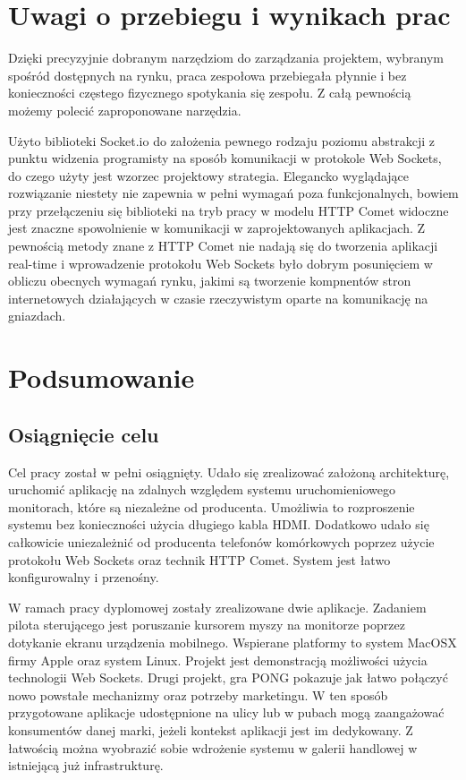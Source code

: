 \newpage
\section{Uwagi o przebiegu i wynikach prac}

Dzięki precyzyjnie dobranym narzędziom do zarządzania projektem, wybranym spośród dostępnych na rynku, praca zespołowa przebiegała płynnie i bez konieczności częstego fizycznego spotykania się zespołu. Z całą pewnością możemy polecić zaproponowane narzędzia.

Użyto biblioteki Socket.io do założenia pewnego rodzaju poziomu abstrakcji z punktu widzenia programisty na sposób komunikacji w protokole Web Sockets, do czego użyty jest wzorzec projektowy strategia. Elegancko wyglądające rozwiązanie niestety nie zapewnia w pełni wymagań poza funkcjonalnych, bowiem przy przełączeniu się biblioteki na tryb pracy w modelu HTTP Comet widoczne jest znaczne spowolnienie w komunikacji w zaprojektowanych aplikacjach. Z pewnością metody znane z HTTP Comet nie nadają się do tworzenia aplikacji real-time i wprowadzenie protokołu Web Sockets było dobrym posunięciem w obliczu obecnych wymagań rynku, jakimi są tworzenie kompnentów stron internetowych działających w czasie rzeczywistym oparte na komunikację na gniazdach.


\section{Podsumowanie}

\subsection{Osiągnięcie celu}

Cel pracy został w pełni osiągnięty. Udało się zrealizować założoną architekturę, uruchomić aplikację na zdalnych względem systemu uruchomieniowego monitorach, które są niezależne od producenta. Umożliwia to rozproszenie systemu bez konieczności użycia długiego kabla HDMI. Dodatkowo udało się całkowicie uniezależnić od producenta telefonów komórkowych poprzez użycie protokołu Web Sockets oraz technik HTTP Comet. System jest łatwo konfigurowalny i przenośny.

W ramach pracy dyplomowej zostały zrealizowane dwie aplikacje. Zadaniem pilota sterującego jest poruszanie kursorem myszy na monitorze poprzez dotykanie ekranu urządzenia mobilnego. Wspierane platformy to system MacOSX firmy Apple oraz system Linux. Projekt jest demonstracją możliwości użycia technologii Web Sockets. Drugi projekt, gra PONG pokazuje jak łatwo połączyć nowo powstałe mechanizmy oraz potrzeby marketingu. W ten sposób przygotowane aplikacje udostępnione na ulicy lub w pubach mogą zaangażować konsumentów danej marki, jeżeli kontekst aplikacji jest im dedykowany. Z łatwością można wyobrazić sobie wdrożenie systemu w galerii handlowej w istniejącą już infrastrukturę.

